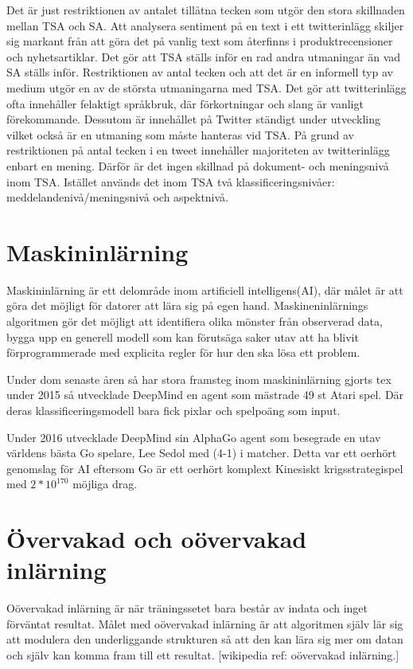 \documentclass{kaumasters} %
\begin{document}
Det är just restriktionen av antalet tillåtna tecken som utgör den stora skillnaden mellan TSA och SA. Att analysera sentiment på en text i ett twitterinlägg skiljer sig markant från att göra det på vanlig text som återfinns i produktrecensioner och nyhetsartiklar. Det gör att TSA ställs inför en rad andra utmaningar än vad SA ställs inför. Restriktionen av antal tecken och att det är en informell typ av medium utgör en av de största utmaningarna med TSA. Det gör att twitterinlägg ofta innehåller felaktigt språkbruk, där förkortningar och slang är vanligt förekommande. Dessutom är innehållet på Twitter ständigt under utveckling vilket också är en utmaning som måste hanteras vid TSA.
På grund av restriktionen på antal tecken i en tweet innehåller majoriteten av twitterinlägg enbart en mening. Därför är det ingen skillnad på dokument- och meningsnivå inom TSA. Istället används det inom TSA två klassificeringsnivåer: meddelandenivå/meningsnivå och aspektnivå\cite{TSAsurvey}.

\section{Maskininlärning}
Maskininlärning är ett delområde inom artificiell intelligens(AI), där målet är att göra det möjligt för datorer att lära sig på egen hand. Maskineninlärnings algoritmen gör det möjligt att identifiera olika mönster från observerad data, bygga upp en generell modell som kan förutsäga saker utav att ha blivit förprogrammerade med explicita regler för hur den ska lösa ett problem.

Under dom senaste åren så har stora framsteg inom maskininlärning gjorts tex under 2015 så utvecklade DeepMind\cite{DMatari00} en agent som mästrade 49 st Atari\cite{wiki:004} spel. Där deras klassificeringsmodell bara fick pixlar och spelpoäng som input. 

Under 2016 utvecklade DeepMind sin AlphaGo\cite{DMgo} agent som besegrade en utav världens bästa Go spelare, Lee Sedol\cite{wiki:005} med (4-1) i matcher. Detta var ett oerhört genomslag för AI eftersom Go är ett oerhört komplext Kinesiskt krigsstrategispel med $2 * 10^{170}$\cite{wiki:006} möjliga drag.
\section{Övervakad och oövervakad inlärning}
Oövervakad inlärning är när träningssetet bara består av indata och inget förväntat resultat. Målet med oövervakad inlärning är att algoritmen själv lär sig att modulera den underliggande strukturen så att den kan lära sig mer om datan och själv kan komma fram till ett resultat. [wikipedia ref: oövervakad inlärning.]
\end{document}
